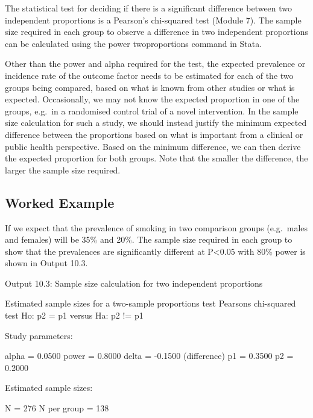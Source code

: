 \documentclass[
]{memoir}
\newenvironment{Shaded}{\begin{snugshade}}{\end{snugshade}}
\newcommand{\NormalTok}[1]{#1}
\begin{document}
The statistical test for deciding if there is a significant difference between two independent proportions is a Pearson's chi-squared test (Module 7). The sample size required in each group to observe a difference in two independent proportions can be calculated using the power twoproportions command in Stata.

Other than the power and alpha required for the test, the expected prevalence or incidence rate of the outcome factor needs to be estimated for each of the two groups being compared, based on what is known from other studies or what is expected. Occasionally, we may not know the expected proportion in one of the groups, e.g.~in a randomised control trial of a novel intervention. In the sample size calculation for such a study, we should instead justify the minimum expected difference between the proportions based on what is important from a clinical or public health perspective. Based on the minimum difference, we can then derive the expected proportion for both groups. Note that the smaller the difference, the larger the sample size required.

\hypertarget{worked-example-16}{%
\subsection{Worked Example}\label{worked-example-16}}

If we expect that the prevalence of smoking in two comparison groups (e.g.~males and females) will be 35\% and 20\%. The sample size required in each group to show that the prevalences are significantly different at P\textless0.05 with 80\% power is shown in Output 10.3.

Output 10.3: Sample size calculation for two independent proportions

\begin{Shaded}
\begin{Highlighting}[]
\NormalTok{Estimated sample sizes for a two{-}sample proportions test}
\NormalTok{Pearson\textquotesingle{}s chi{-}squared test }
\NormalTok{Ho: p2 = p1  versus  Ha: p2 != p1}

\NormalTok{Study parameters:}

\NormalTok{        alpha =    0.0500}
\NormalTok{        power =    0.8000}
\NormalTok{        delta =   {-}0.1500  (difference)}
\NormalTok{           p1 =    0.3500}
\NormalTok{           p2 =    0.2000}

\NormalTok{Estimated sample sizes:}

\NormalTok{            N =       276}
\NormalTok{  N per group =       138}
\end{Highlighting}
\end{Shaded}
\end{document}
